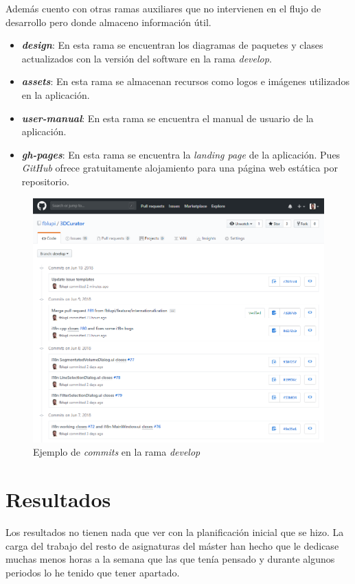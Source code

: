Además cuento con otras ramas auxiliares que no intervienen en el flujo de desarrollo pero donde almaceno información útil.

\begin{itemize}
	\item \textbf{\textit{design}}: En esta rama se encuentran los diagramas de paquetes y clases actualizados con la versión del software en la rama \textit{develop}.
	\item \textbf{\textit{assets}}: En esta rama se almacenan recursos como logos e imágenes utilizados en la aplicación.
	\item \textbf{\textit{user-manual}}: En esta rama se encuentra el manual de usuario de la aplicación.
	\item \textbf{\textit{gh-pages}}: En esta rama se encuentra la \textit{landing page} de la aplicación. Pues \textit{GitHub} ofrece gratuitamente alojamiento para una página web estática por repositorio.
\end{itemize}

\begin{figure}[H]
	\centering
	\includegraphics[width=12cm]{imagenes/planificacion/commits}
	\caption{Ejemplo de \textit{commits} en la rama \textit{develop}}
	\label{fig:planificacion/commits}
\end{figure}

\section{Resultados}

Los resultados no tienen nada que ver con la planificación inicial que se hizo. La carga del trabajo del resto de asignaturas del máster han hecho que le dedicase muchas menos horas a la semana que las que tenía pensado y durante algunos periodos lo he tenido que tener apartado.

